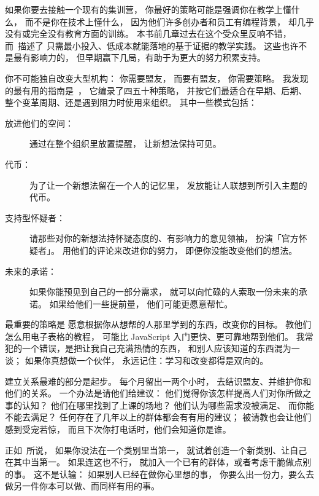 如果你要去接触一个现有的集训营，
你最好的策略可能是强调你在教学上懂什么，
而不是你在技术上懂什么，
因为他们许多创办者和员工有编程背景，
却几乎没有或完全没有教育方面的训练。
本书前几章过去在这个受众里反响不错，
而~\cite{Lang2016}描述了
只需最小投入、低成本就能落地的基于证据的教学实践。
这些也许不是最有影响力的，
但早期赢下几局，有助于为更大的努力积累支持。


你不可能独自改变大型机构：
你需要盟友，
而要有盟友，
你需要策略。
我发现的最有用的指南是~\cite{Mann2015}，
它编录了四五十种策略，
并按它们最适合在早期、后期、整个变革周期、还是遇到阻力时使用来组织。
其中一些模式包括：

\begin{description}

\item[放进他们的空间：]
  通过在整个组织里放置提醒，
  让新想法保持可见。

\item[代币：]
  为了让一个新想法留在一个人的记忆里，
  发放能让人联想到所引入主题的代币。

\item[支持型怀疑者：]
  请那些对你的新想法持怀疑态度的、有影响力的意见领袖，
  扮演「官方怀疑者」。
  用他们的评论来改进你的努力，
  即便你没能改变他们的想法。

\item[未来的承诺：]
  如果你能预见到自己的一部分需求，
  就可以向忙碌的人索取一份未来的承诺。
  如果给他们一些提前量，
  他们可能更愿意帮忙。
  
\end{description}

最重要的策略是
愿意根据你从想帮的人那里学到的东西，改变你的目标。
教他们怎么用电子表格的教程，
可能比 JavaScript 入门更快、更可靠地帮到他们。
我常犯的一个错误，是把让我自己充满热情的东西，
和别人应该知道的东西混为一谈；
如果你真想做一个伙伴，
永远记住：学习和改变都得是双向的。

建立关系最难的部分是起步。
每个月留出一两个小时，
去结识盟友、并维护你和他们的关系。
一个办法是请他们给建议：
他们觉得你该怎样提高人们对你所做之事的认知？
他们在哪里找到了上课的场地？
他们认为哪些需求没被满足、
而你能不能去满足？
任何存在了几年以上的群体都会有有用的建议；
被请教也会让他们感到受宠若惊，
而且下次你打电话时，他们会知道你是谁。

正如~\cite{Kuch2011}所说，
如果你没法在一个类别里当第一，
就试着创造一个新类别、让自己在其中当第一。
如果连这也不行，
就加入一个已有的群体，或者考虑干脆做点别的事。
这不是认输：
如果别人已经在做你心里想的事，
你要么出一份力，要么去做另一件你本可以做、而同样有用的事。

